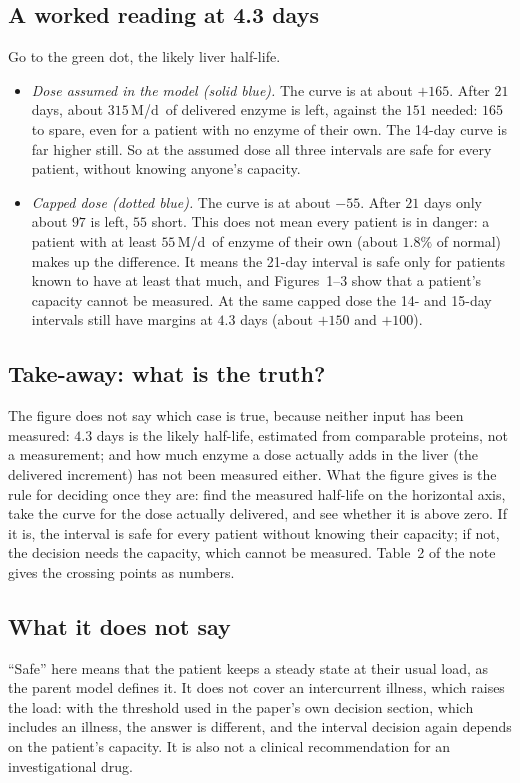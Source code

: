 \documentclass[11pt,a4paper]{article}
\newcommand{\um}{\,\textmu M/d}
\begin{document}
\subsection{A worked reading at 4.3 days} Go to the green dot, the likely liver half-life.
\begin{itemize}
\item \emph{Dose assumed in the model (solid blue).} The curve is at about $+165$. After $21$ days, about
$315$\um\ of delivered enzyme is left, against the $151$ needed: $165$ to spare, even for a
patient with no enzyme of their own. The 14-day curve is far higher still. So at the assumed dose
all three intervals are safe for every patient, without knowing anyone's capacity.
\item \emph{Capped dose (dotted blue).} The curve is at about $-55$. After $21$ days only about
$97$ is left, $55$ short. This does not mean every patient is in danger: a patient with at least
$55$\um\ of enzyme of their own (about $1.8\%$ of normal) makes up the difference. It means the
21-day interval is safe only for patients known to have at least that much, and Figures~1--3 show
that a patient's capacity cannot be measured. At the same capped dose the 14- and 15-day
intervals still have margins at $4.3$ days (about $+150$ and $+100$).
\end{itemize}

\subsection{Take-away: what is the truth?} The figure does not say which case is true, because
neither input has been measured: $4.3$ days is the likely half-life, estimated from comparable
proteins, not a measurement; and how much enzyme a dose actually adds in the liver (the delivered
increment) has not been measured either. What the figure gives is the rule for deciding once they
are: find the measured half-life on the horizontal axis, take the curve for the dose actually
delivered, and see whether it is above zero. If it is, the interval is safe for every patient
without knowing their capacity; if not, the decision needs the capacity, which cannot be
measured. Table~2 of the note gives the crossing points as numbers.

\subsection{What it does not say} ``Safe'' here means that the patient keeps a steady state at
their usual load, as the parent model defines it. It does not cover an intercurrent illness,
which raises the load: with the threshold used in the paper's own decision section, which
includes an illness, the answer is different, and the interval decision again depends on the
patient's capacity. It is also not a clinical recommendation for an investigational drug.
\end{document}
